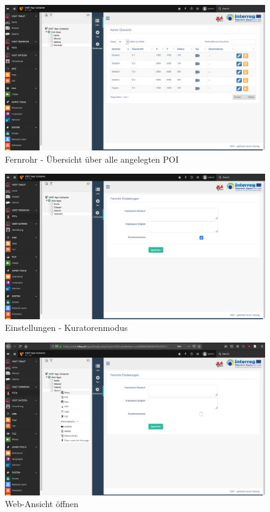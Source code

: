 \begin{figure}[ht!]
\centering
\includegraphics[width=12cm]{Figures/paula/fernrohr/fernrohr_liste.png}
\caption{Fernrohr - Übersicht über alle angelegten POI}
\label{img:fernrohr_listenuebersicht}
\end{figure}

\begin{figure}[ht!]
\centering
\includegraphics[width=12cm]{Figures/paula/fernrohr/fernrohr_einstellungen.png}
\caption{Einstellungen - Kuratorenmodus}
\label{img:fernrohr_einstellungen}
\end{figure}

\begin{figure}[ht!]
\centering
\includegraphics[width=12cm]{Figures/paula/fernrohr/fernrohr_ansicht_browser.png}
\caption{Web-Ansicht öffnen}
\label{img:fernrohr_browser_ansicht}
\end{figure}


